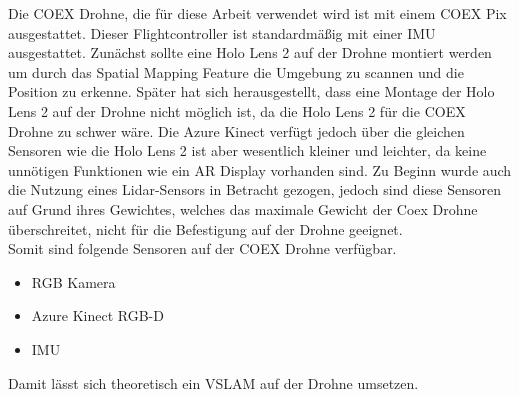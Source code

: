 Die COEX Drohne, die für diese Arbeit verwendet wird ist mit einem COEX Pix ausgestattet.
Dieser Flightcontroller ist standardmäßig mit einer IMU ausgestattet. Zunächst sollte eine Holo Lens 2 auf der Drohne montiert werden um durch das Spatial Mapping Feature die Umgebung zu scannen und die Position zu erkenne.
Später hat sich herausgestellt, dass eine Montage der Holo Lens 2 auf der Drohne nicht möglich ist, da die Holo Lens 2 für die COEX Drohne zu schwer wäre.
Die Azure Kinect verfügt jedoch über die gleichen Sensoren wie die Holo Lens 2 ist aber wesentlich kleiner und leichter, da keine unnötigen Funktionen wie ein \ac{AR} Display vorhanden sind.
Zu Beginn wurde auch die Nutzung eines \ac{Lidar}-Sensors in Betracht gezogen, jedoch sind diese Sensoren auf Grund ihres Gewichtes, welches das maximale Gewicht der Coex Drohne überschreitet, nicht für die Befestigung auf der Drohne geeignet.\\
Somit sind folgende Sensoren auf der COEX Drohne verfügbar.

\begin{itemize}
    \item{RGB Kamera}
    \item{Azure Kinect \ac{RGB-D}}
    \item{IMU}
\end{itemize}

Damit lässt sich theoretisch ein \ac{VSLAM} auf der Drohne umsetzen.


